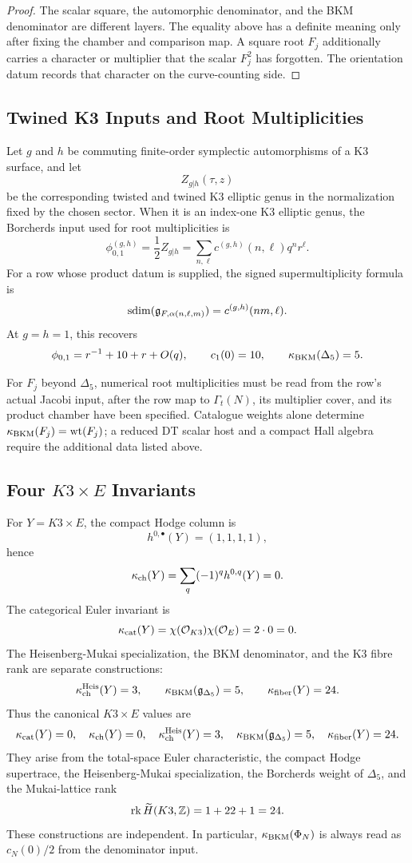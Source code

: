 \begin{proof}
The scalar square, the automorphic denominator, and the BKM
denominator are different layers.  The equality above has a definite
meaning only after fixing the chamber and comparison map.  A square
root \(F_j\) additionally carries a character or multiplier that the
scalar \(F_j^2\) has forgotten.  The orientation datum records that
character on the curve-counting side.
\end{proof}

\subsection{Twined K3 Inputs and Root Multiplicities}
\label{subsec:twined-root-multiplicities}

Let \(g\) and \(h\) be commuting finite-order symplectic automorphisms
of a K3 surface, and let
\[
        Z_{g|h}(\tau,z)
\]
be the corresponding twisted and twined K3 elliptic genus in the
normalization fixed by the chosen sector.  When it is an index-one K3
elliptic genus, the Borcherds input used for root multiplicities is
\[
        \phi^{(g,h)}_{0,1}=\frac12 Z_{g|h}
        =\sum_{n,\ell}c^{(g,h)}(n,\ell)q^nr^\ell .
\]
For a row whose product datum is supplied, the signed
supermultiplicity formula is
\[
        \operatorname{sdim}(\mathfrak{g}_{F,\alpha(n,\ell,m)})
        =c^{(g,h)}(nm,\ell).
\]
At \(g=h=1\), this recovers
\[
        \phi_{0,1}=r^{-1}+10+r+O(q),\qquad
        c_1(0)=10,\qquad
        \kappa_{\mathrm{BKM}}(\Delta_5)=5 .
\]

For \(F_j\) beyond \(\Delta_5\), numerical root multiplicities must be
read from the row's actual Jacobi input, after the row map to
\(\Gamma_t(N)\), its multiplier cover, and its product chamber have
been specified.  Catalogue weights alone determine
\(\kappa_{\mathrm{BKM}}(F_j)=\operatorname{wt}(F_j)\); a reduced DT scalar host and a compact Hall
algebra require the additional data listed above.

\subsection{Four \(K3\times E\) Invariants}
\label{subsec:k3e-invariants-separated}

For \(Y=K3\times E\), the compact Hodge column is
\[
        h^{0,\bullet}(Y)=(1,1,1,1),
\]
hence
\[
        \kappa_{\mathrm{ch}}(Y)=\sum_q(-1)^qh^{0,q}(Y)=0 .
\]
The categorical Euler invariant is
\[
        \kappa_{\mathrm{cat}}(Y)=\chi(\mathcal{O}_{K3})\chi(\mathcal{O}_E)=2\cdot0=0 .
\]
The Heisenberg-Mukai specialization, the BKM denominator, and the
K3 fibre rank are separate constructions:
\[
        \kappa_{\mathrm{ch}}^{\mathrm{Heis}}(Y)=3,\qquad
        \kappa_{\mathrm{BKM}}(\mathfrak{g}_{\Delta_5})=5,\qquad
        \kappa_{\mathrm{fiber}}(Y)=24 .
\]
Thus the canonical \(K3\times E\) values are
\[
        \kappa_{\mathrm{cat}}(Y)=0,\quad
        \kappa_{\mathrm{ch}}(Y)=0,\quad
        \kappa_{\mathrm{ch}}^{\mathrm{Heis}}(Y)=3,\quad
        \kappa_{\mathrm{BKM}}(\mathfrak{g}_{\Delta_5})=5,\quad
        \kappa_{\mathrm{fiber}}(Y)=24.
\]
They arise from the total-space Euler characteristic, the compact
Hodge supertrace, the Heisenberg-Mukai specialization, the Borcherds
weight of \(\Delta_5\), and the Mukai-lattice rank
\[
        \operatorname{rk}\widetilde H(K3,\mathbb{Z})=1+22+1=24 .
\]
These constructions are independent.  In particular,
\(\kappa_{\mathrm{BKM}}(\Phi_N)\) is always read as \(c_N(0)/2\) from the denominator
input.

